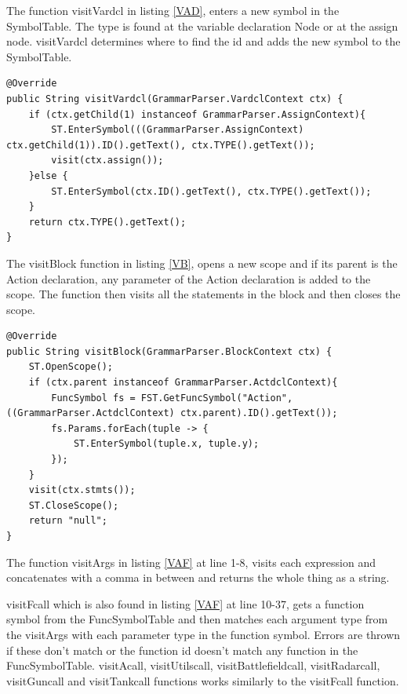 The function visitVardcl in listing \ref{VAD}, enters a new symbol in the SymbolTable. The type is found at the variable declaration Node or at the assign node. visitVardcl determines where to find the id and adds the new symbol to the SymbolTable. 

\begin{lstlisting}[caption={SymbolTypeVisitor - visitVardcl function}, label={VAD}]
@Override
public String visitVardcl(GrammarParser.VardclContext ctx) {
    if (ctx.getChild(1) instanceof GrammarParser.AssignContext){
        ST.EnterSymbol(((GrammarParser.AssignContext) ctx.getChild(1)).ID().getText(), ctx.TYPE().getText());
        visit(ctx.assign());
    }else {
        ST.EnterSymbol(ctx.ID().getText(), ctx.TYPE().getText());
    }
    return ctx.TYPE().getText();
}
\end{lstlisting}

The visitBlock function in listing \ref{VB}, opens a new scope and if its parent is the Action declaration, any parameter of the Action declaration  is added to the scope. The function then visits all the statements in the block and then closes the scope. 

\begin{lstlisting}[caption={SymbolTypeVisitor - visitBlock function}, label={VB}]
@Override
public String visitBlock(GrammarParser.BlockContext ctx) {
    ST.OpenScope();
    if (ctx.parent instanceof GrammarParser.ActdclContext){
        FuncSymbol fs = FST.GetFuncSymbol("Action", ((GrammarParser.ActdclContext) ctx.parent).ID().getText());
        fs.Params.forEach(tuple -> {
            ST.EnterSymbol(tuple.x, tuple.y);
        });
    }
    visit(ctx.stmts());
    ST.CloseScope();
    return "null";
}
\end{lstlisting}

The function visitArgs in listing \ref{VAF} at line 1-8, visits each expression and concatenates with a comma in between and returns the whole thing as a string. 

visitFcall which is also found in listing \ref{VAF} at line 10-37, gets a function symbol from the FuncSymbolTable and then matches each argument type from the visitArgs with each parameter type in the function symbol. Errors are thrown if these don't match or the function id doesn't match any function in the FuncSymbolTable. visitAcall, visitUtilscall, visitBattlefieldcall, visitRadarcall, visitGuncall and visitTankcall functions works similarly to the visitFcall function.

